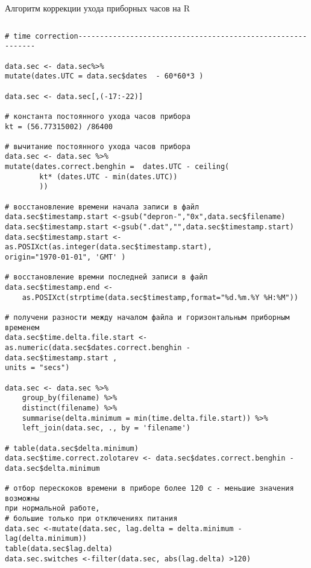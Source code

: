 
\begin{ListingEnv}[H]	
	\caption{Алгоритм коррекции ухода 
		приборных часов на R}

	\label{list:timecor}
	\begin{lstlisting}[language={Renhanced}, ]
	\end{lstlisting}
\end{ListingEnv}

\begin{lstlisting}[language={Renhanced}, ]
# time correction------------------------------------------------------------

data.sec <- data.sec%>%
mutate(dates.UTC = data.sec$dates  - 60*60*3 )

data.sec <- data.sec[,(-17:-22)]

# константа постоянного ухода часов прибора
kt = (56.77315002) /86400

# вычитание постоянного ухода часов прибора
data.sec <- data.sec %>%
mutate(dates.correct.benghin =  dates.UTC - ceiling(
		kt* (dates.UTC - min(dates.UTC))
		))

# восстановление времени начала записи в файл
data.sec$timestamp.start <-gsub("depron-","0x",data.sec$filename)
data.sec$timestamp.start <-gsub(".dat","",data.sec$timestamp.start)
data.sec$timestamp.start <- as.POSIXct(as.integer(data.sec$timestamp.start), 
origin="1970-01-01", 'GMT' )

# восстановление времни последней записи в файл
data.sec$timestamp.end <- 
	as.POSIXct(strptime(data.sec$timestamp,format="%d.%m.%Y %H:%M"))

# получени разности между началом файла и горизонтальным приборным временем
data.sec$time.delta.file.start <- as.numeric(data.sec$dates.correct.benghin - 
data.sec$timestamp.start ,
units = "secs") 

data.sec <- data.sec %>%
	group_by(filename) %>%
	distinct(filename) %>%
	summarise(delta.minimum = min(time.delta.file.start)) %>%
	left_join(data.sec, ., by = 'filename')

# table(data.sec$delta.minimum)
data.sec$time.correct.zolotarev <- data.sec$dates.correct.benghin - 
data.sec$delta.minimum 

# отбор перескоков времени в приборе более 120 с - меньшие значения возможны 
при нормальной работе, 
# большие только при отключениях питания
data.sec <-mutate(data.sec, lag.delta = delta.minimum - lag(delta.minimum))
table(data.sec$lag.delta)
data.sec.switches <-filter(data.sec, abs(lag.delta) >120)


\end{lstlisting}
